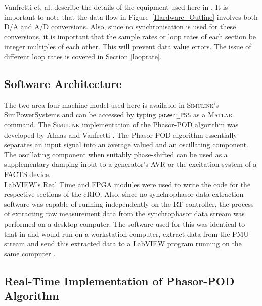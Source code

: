 \documentclass[journal]{IEEEtran}
\begin{document}
Vanfretti et. al. describe the details of the equipment used here in \cite{SmarTSLab}. It is important to note that the data flow in Figure~\ref{Hardware_Outline} involves both D/A and A/D conversions. Also, since no synchronisation is used for these conversions, it is important that the sample rates or loop rates of each section be integer multiples of each other. This will prevent data value errors. The issue of different loop rates is covered in Section \ref{looprate}.\\

\subsection{Software Architecture}
The two-area four-machine model used here is available in \textsc{Simulink}'s SimPowerSystems and can be accessed by typing \texttt{power\_PSS} as a \textsc{Matlab} command. The \textsc{Simulink} implementation of the Phasor-POD algorithm was developed by Almas and Vanfretti \cite{PhasorPODImplement}. The Phasor-POD algorithm essentially separates an input signal into an average valued and an oscillating component. The oscillating component when suitably phase-shifted can be used as a supplementary damping input to a generator's AVR or the excitation system of a FACTS device.\\

LabVIEW's Real Time and FPGA modules were used to write the code for the respective sections of the cRIO. Also,  since no synchrophasor data-extraction software was capable of running independently on the RT controller, the process of extracting raw measurement data from the synchrophasor data stream was performed on a desktop computer. The software used for this was identical to that in \cite{SDK} and would run on a workstation computer, extract data from the PMU stream and send this extracted data to a LabVIEW program running on the same computer \cite{SDK}. \\

\subsection{Real-Time Implementation of Phasor-POD Algorithm}
\end{document}
